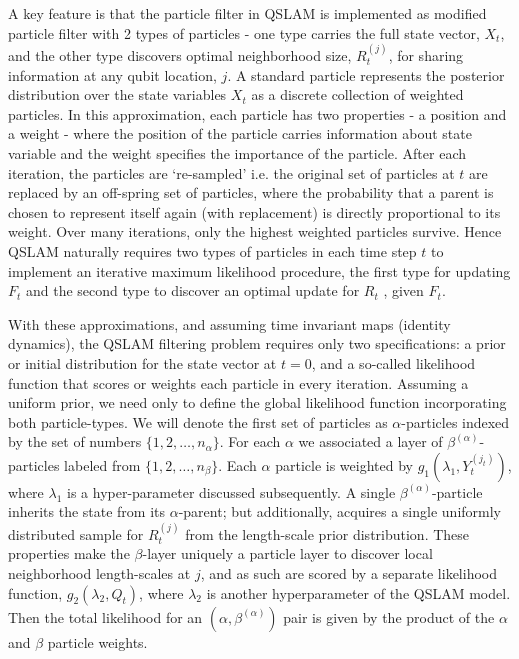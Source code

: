 A key feature is that the particle filter in QSLAM is implemented as modified particle filter with 2 types of particles - one type carries the full state vector, $X_t$, and the other type discovers optimal neighborhood size, $R_t^{(j)}$, for sharing information at any qubit location, $j$.  A standard particle represents the posterior distribution over the state variables $X_t$ as a discrete collection of weighted particles. In this approximation, each particle has two properties - a position and a weight - where the position of the particle carries information about state variable and the weight specifies the importance of the particle. After each iteration, the particles are `re-sampled' i.e. the original set of particles at $t$ are replaced by an off-spring set of particles, where the probability that a parent is chosen to represent itself again (with replacement) is directly proportional to its weight. Over many iterations, only the highest weighted particles survive. Hence QSLAM naturally requires two types of particles in each time step $t$ to implement an iterative maximum likelihood procedure, the first type for  updating $F_t$ and the second type to discover an optimal update for $R_t$ , given $F_t$.

With these approximations, and assuming time invariant maps (identity dynamics), the QSLAM filtering problem requires only two specifications: a prior or initial distribution for the state vector at $t=0$, and a so-called likelihood function that scores or weights each particle in every iteration. Assuming a uniform prior, we need only to define the global likelihood function incorporating both particle-types. We will denote the first set of particles as $\alpha$-particles indexed by the set of numbers $\{1, 2, \hdots, n_\alpha\}$. For each $\alpha$ we associated a layer of $\beta^{(\alpha)}$-particles labeled from $\{1, 2, \hdots, n_\beta \}$. Each  $\alpha$ particle is weighted by $ g_1(\lambda_1, Y_t^{(j_t)})$, where $\lambda_1$ is a hyper-parameter discussed subsequently. A single $\beta^{(\alpha)}$-particle inherits the state from its $\alpha$-parent; but additionally, acquires a single uniformly distributed sample for $R_t^{(j)}$ from the length-scale prior distribution. These properties make the $\beta$-layer uniquely a particle layer to discover local neighborhood length-scales at $j$, and as such are scored by a separate likelihood function, $g_2(\lambda_2, Q_t)$, where $\lambda_2$ is another hyperparameter of the QSLAM model. Then the total likelihood for an $(\alpha, \beta^{(\alpha)})$ pair is given by the product of the $\alpha$ and $\beta$ particle weights. %

